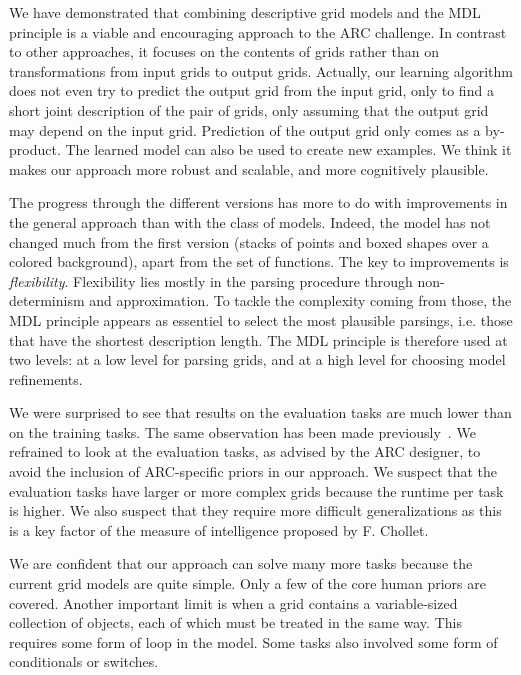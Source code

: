 \documentclass[a4paper]{llncs}
\newcommand{\HIDE}[1]{}
\begin{document}

We have demonstrated that combining descriptive grid models and the
MDL principle is a viable and encouraging approach to the ARC
challenge. In contrast to other approaches, it focuses on the contents
of grids rather than on transformations from input grids to output
grids. Actually, our learning algorithm does not even try to predict
the output grid from the input grid, only to find a short joint
description of the pair of grids, only assuming that the output grid
may depend on the input grid. Prediction of the output grid only comes
as a by-product. The learned model can also be used to create new
examples. We think it makes our approach more robust and scalable, and
more cognitively plausible.

The progress through the different versions has more to do with
improvements in the general approach than with the class of
models. Indeed, the model has not changed much from the first version
(stacks of points and boxed shapes over a colored background), apart
from the set of functions. The key to improvements is {\em
  flexibility}. Flexibility lies mostly in the parsing procedure
through non-determinism and approximation. To tackle the complexity
coming from those, the MDL principle appears as essentiel to select
the most plausible parsings, i.e. those that have the shortest
description length. The MDL principle is therefore used at two levels:
at a low level for parsing grids, and at a high level for choosing
model refinements.

We were surprised to see that results on the evaluation tasks are much
lower than on the training tasks. The same observation has been made
previously~\cite{Fischer2020}. We refrained to look at the evaluation
tasks, as advised by the ARC designer, to avoid the inclusion of
ARC-specific priors in our approach. We suspect that the evaluation
tasks have larger or more complex grids because the runtime per task
is higher. We also suspect that they require more difficult
generalizations as this is a key factor of the measure of intelligence
proposed by F. Chollet.

We are confident that our approach can solve many more tasks because
the current grid models are quite simple. Only a few of the core human
priors are covered. \HIDE{Second, a number of tasks involve relatively
  simple whole-grid transformations (e.g. rotations,
  symmetries). Those are typically the tasks that are solved by
  transformation-based approaches but are not yet solvable by our
  model.} Another important limit is when a grid contains a
variable-sized collection of objects, each of which must be treated in
the same way. This requires some form of loop in the model. Some tasks
also involved some form of conditionals or switches.
\end{document}

